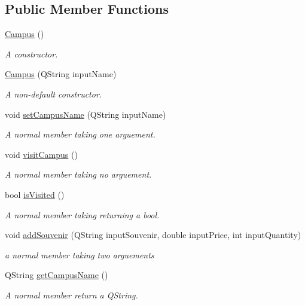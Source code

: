 \subsection*{Public Member Functions}
\begin{DoxyCompactItemize}
\item 
\hyperlink{class_campus_abda28c16930a310df27f2f47fc5e15b1}{Campus} ()
\begin{DoxyCompactList}\small\item\em A constructor. \end{DoxyCompactList}\item 
\hyperlink{class_campus_afd0eebcf5837173c3fcb1309a2adce35}{Campus} (Q\+String input\+Name)
\begin{DoxyCompactList}\small\item\em A non-\/default constructor. \end{DoxyCompactList}\item 
void \hyperlink{class_campus_abb6121ca36778fc41590e3e40f1c7f66}{set\+Campus\+Name} (Q\+String input\+Name)
\begin{DoxyCompactList}\small\item\em A normal member taking one arguement. \end{DoxyCompactList}\item 
void \hyperlink{class_campus_a23f09217ec446b76c152efb9fe4a4b56}{visit\+Campus} ()
\begin{DoxyCompactList}\small\item\em A normal member taking no arguement. \end{DoxyCompactList}\item 
bool \hyperlink{class_campus_aa033579f18b429b55589d43da459a571}{is\+Visited} ()
\begin{DoxyCompactList}\small\item\em A normal member taking returning a bool. \end{DoxyCompactList}\item 
void \hyperlink{class_campus_a879fb70e4b00061fe37e74dfe6808c25}{add\+Souvenir} (Q\+String input\+Souvenir, double input\+Price, int input\+Quantity)
\begin{DoxyCompactList}\small\item\em a normal member taking two arguements \end{DoxyCompactList}\item 
Q\+String \hyperlink{class_campus_a809e348ff4c9d6c91aef834169c9ecf3}{get\+Campus\+Name} ()
\begin{DoxyCompactList}\small\item\em A normal member return a Q\+String. \end{DoxyCompactList}\item 

\end{DoxyCompactItemize}

